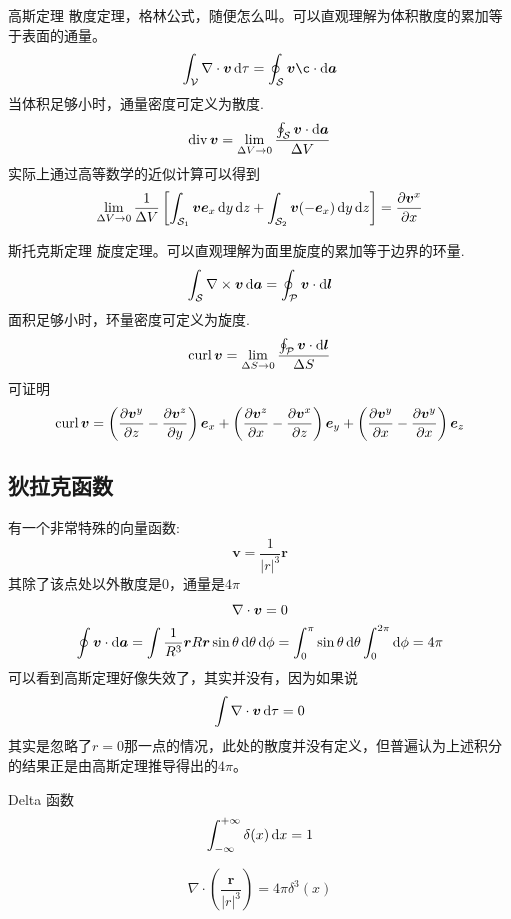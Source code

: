 \documentclass{mynote}
\begin{document}
\begin{theorem}{高斯定理}
    散度定理，格林公式，随便怎么叫。可以直观理解为体积散度的累加等于表面的通量。
    \[
    \int_{\mathcal{V}} \nabla \cdot \bm{v} \dl \tau = \oint_{\mathcal{S}} \bm{v} \c \cdot \dl \bm{a}    
    \]
    当体积足够小时，通量密度可定义为散度.
    \[
    \mathop{\mathrm{div}} \boldsymbol{v} = \lim_{\Delta V \to 0} \frac{\oint_{\mathcal{S}} \boldsymbol{v} \cdot \mathop{}\!\mathrm{d} \boldsymbol{a}}{\Delta V}    
    \]
    实际上通过高等数学的近似计算可以得到
    \[
    \lim_{\Delta V \to 0} \frac{1}{\Delta V} \left[ \int_{\mathcal{S}_1} \boldsymbol{v} \boldsymbol{e}_x \mathop{}\!\mathrm{d} y \mathop{}\!\mathrm{d} z + \int_{\mathcal{S}_2} \boldsymbol{v}(-\boldsymbol{e}_x) \mathop{}\!\mathrm{d} y \mathop{}\!\mathrm{d} z\right] = \dfrac{\partial \boldsymbol{v}^x}{\partial x}
    \]
\end{theorem}


\begin{theorem}{斯托克斯定理}
    旋度定理。可以直观理解为面里旋度的累加等于边界的环量.
    \[
    \int_{\mathcal{S}} \nabla \times \boldsymbol{v} \mathop{}\!\mathrm{d} \boldsymbol{a} = \oint_{\mathcal{P}} \boldsymbol{v} \cdot \mathop{}\!\mathrm{d} \boldsymbol{l}     
    \]
    面积足够小时，环量密度可定义为旋度.
    \[
    \mathop{\mathrm{curl}} \boldsymbol{v} = \lim_{\Delta S \to 0} \frac{\oint_{\mathcal{P}} \boldsymbol{v} \cdot \mathop{}\!\mathrm{d} \boldsymbol{l}}{\Delta S}
    \]
    可证明
    \[
        \mathop{\mathrm{curl}} \boldsymbol{v} =   \left( \dfrac{\partial \boldsymbol{v}^y}{\partial z} - \dfrac{\partial \boldsymbol{v}^z}{\partial y} \right) \boldsymbol{e}_x + \left( \dfrac{\partial \boldsymbol{v}^z}{\partial x} - \dfrac{\partial \boldsymbol{v}^x}{\partial z} \right) \boldsymbol{e}_y + \left( \dfrac{\partial \boldsymbol{v}^y}{\partial x} - \dfrac{\partial \boldsymbol{v}^y}{\partial x} \right) \boldsymbol{e}_z   
    \]
\end{theorem}


\subsection{狄拉克函数}
有一个非常特殊的向量函数:
\[
\bm{v} = \frac{1}{\vert r \vert^3} \bm{r}    
\]
其除了该点处以外散度是$0$，通量是$4 \pi$
\begin{gather*}
    \nabla \cdot \boldsymbol{v} = 0 \\
    \oint \boldsymbol{v} \cdot \mathop{}\!\mathrm{d} \boldsymbol{a} = \int \frac{1}{R^3} \boldsymbol{r} R \boldsymbol{r} \sin \theta \mathop{}\!\mathrm{d} \theta \mathop{}\!\mathrm{d} \phi = \int_{0}^{\pi} \sin \theta \mathop{}\!\mathrm{d} \theta \int_{0}^{2\pi} \mathop{}\!\mathrm{d} \phi = 4 \pi
\end{gather*}
可以看到高斯定理好像失效了，其实并没有，因为如果说
\[
\int \nabla \cdot \boldsymbol{v} \mathop{}\!\mathrm{d} \tau = 0    
\]
其实是忽略了$r = 0$那一点的情况，此处的散度并没有定义，但普遍认为上述积分的结果正是由高斯定理推导得出的$4\pi$。



\begin{define}{Delta 函数}
    \[
    \int_{-\infty}^{+\infty} \delta(x) \mathop{}\!\mathrm{d} x = 1    
    \]
\end{define}


\begin{proposition}
    \[
    \nabla \cdot \left( \frac{\bm{r}}{\vert r \vert^3} \right) = 4\pi \delta^3(x)    
    \]
\end{proposition}
\end{document}
